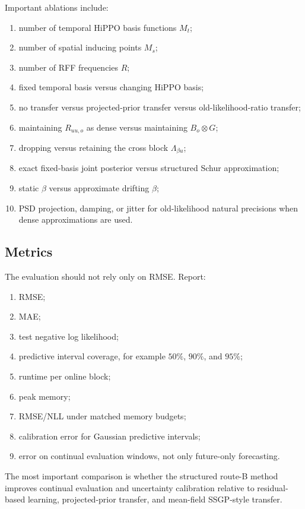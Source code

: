 \documentclass[12pt]{article}
\begin{document}
Important ablations include:
\begin{enumerate}[label=(\arabic*)]
    \item number of temporal HiPPO basis functions $M_t$;
    \item number of spatial inducing points $M_s$;
    \item number of RFF frequencies $R$;
    \item fixed temporal basis versus changing HiPPO basis;
    \item no transfer versus projected-prior transfer versus old-likelihood-ratio transfer;
    \item maintaining $R_{uu,o}$ as dense versus maintaining $B_o\otimes G$;
    \item dropping versus retaining the cross block $\Lambda_{\beta u}$;
    \item exact fixed-basis joint posterior versus structured Schur approximation;
    \item static $\beta$ versus approximate drifting $\beta$;
    \item PSD projection, damping, or jitter for old-likelihood natural precisions when
    dense approximations are used.
\end{enumerate}

\subsection{Metrics}

The evaluation should not rely only on RMSE. Report:
\begin{enumerate}[label=(\arabic*)]
    \item RMSE;
    \item MAE;
    \item test negative log likelihood;
    \item predictive interval coverage, for example $50\%$, $90\%$, and $95\%$;
    \item runtime per online block;
    \item peak memory;
    \item RMSE/NLL under matched memory budgets;
    \item calibration error for Gaussian predictive intervals;
    \item error on continual evaluation windows, not only future-only forecasting.
\end{enumerate}

The most important comparison is whether the structured route-B method improves
continual evaluation and uncertainty calibration relative to residual-based learning,
projected-prior transfer, and mean-field SSGP-style transfer.
\end{document}
